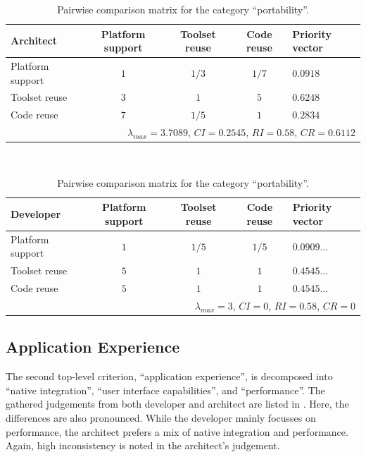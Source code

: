 \begin{table}[h!]
    \centering
    \begin{tabular}{lcccl}
        \hline
        \textbf{Architect}     & Platform support & Toolset reuse & Code reuse & Priority vector \\ 
        \hline
        Platform support       & $1$            & $1/3$         & $1/7$      & $0.0918$          \\
        Toolset reuse          & $3$            & $1$           & $5$        & $0.6248$          \\
        Code reuse             & $7$            & $1/5$         & $1$        & $0.2834$          \\
        \hline
        \multicolumn{5}{r}{$\lambda_{max} = 3.7089$, $CI = 0.2545$, $RI = 0.58$, $CR = 0.6112$}  \\
        \hline
    \end{tabular}
    \\\vspace{1em}
    \begin{tabular}{lcccl}
        \hline
        \textbf{Developer}     & Platform support & Toolset reuse & Code reuse & Priority vector \\ 
        \hline
        Platform support         & $1$            & $1/5$         & $1/5$      & $0.0909\ldots$  \\
        Toolset reuse          & $5$            & $1$           & $1$        & $0.4545\ldots$  \\
        Code reuse             & $5$            & $1$           & $1$        & $0.4545\ldots$  \\
        \hline
        \multicolumn{5}{r}{$\lambda_{max} = 3$, $CI = 0$, $RI = 0.58$, $CR = 0$}               \\
        \hline
    \end{tabular}
    \caption{Pairwise comparison matrix for the category ``portability''.}
    \label{tab:portability}
\end{table}

\subsection{Application Experience}

The second top-level criterion, ``application experience'', is decomposed into ``native integration'', ``user interface capabilities'', and ``performance''. The gathered judgements from both developer and architect are listed in . Here, the differences are also pronounced. While the developer mainly focusses on performance, the architect prefers a mix of native integration and performance. Again, high inconsistency is noted in the architect's judgement.

